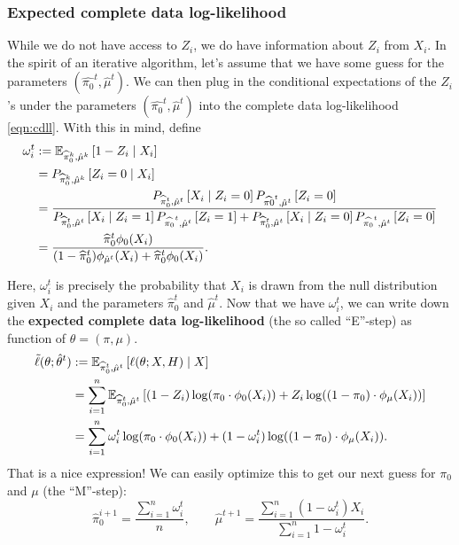 \subsubsection*{Expected complete data log-likelihood}
While we do not have access to $Z_i$, we do have information about $Z_i$ from $X_i$.  In the spirit of an iterative algorithm, let's assume that we have some guess for the parameters $(\hat{\pi_0}^t, \hat{\mu}^t)$. We can then plug in the conditional expectations of the $Z_i$'s under the parameters $(\hat{\pi_0}^t, \hat{\mu}^t)$ into the complete data log-likelihood \eqref{eqn:cdll}. With this in mind, define
\begin{align*}
\omega_i^t &:= {\mathbb E}_{\widehat{\pi}_0^k, \hat{\mu}^k} \left[ 1-Z_i \mid X_i \right] \\
&= P_{\widehat{\pi}_0^k, \hat{\mu}^k} \left[ Z_i = 0 \mid X_i \right] \\ 
&= \frac{P_{\widehat{\pi}_0^t, \hat{\mu}^t} \left[  X_i \mid Z_i = 0\right]P_{\widehat{\pi0}^t, \hat{\mu}^t}\left[Z_i = 0\right]}{P_{\widehat{\pi}_0^t, \hat{\mu}^t} \left[  X_i \mid Z_i = 1\right]P_{\widehat{\pi_0}^t, \hat{\mu}^t}\left[Z_i = 1\right]+P_{\widehat{\pi}_0^t, \hat{\mu}^t} \left[  X_i \mid Z_i = 0\right]P_{\widehat{\pi_0}^t, \hat{\mu}^t}\left[Z_i = 0\right] }\\
&= \frac{ \widehat{\pi}_0^t \phi_{0}(X_i)}{(1-\widehat{\pi}_0^t) \phi_{\hat{\mu}^t}(X_i) + \widehat{\pi}_0^t \phi_{0}(X_i)}.
\end{align*}

Here, $\omega_i^t$ is precisely the probability that $X_i$ is drawn from the null distribution given $X_i$ and the parameters $\hat{\pi}_0^t$ and $\hat{\mu}^t$. Now that we have $\omega_i^t$,  we can write down the \textbf{expected complete data log-likelihood} (the so called ``E''-step) as function of $\theta = (\pi,\mu)$.
\begin{align}
\tilde{\ell}(\theta; \hat{\theta}^t) &:= {\mathbb E}_{\widehat{\pi}_0^t, \hat{\mu}^t} \left[ \ell(\theta; X, H) \mid X \right] \label{eqn:estep} \\ 
&=\sum_{i=1}^n {\mathbb E}_{\widehat{\pi}_0^t, \hat{\mu}^t} \left[ (1-Z_i) \log(\pi_0 \cdot \phi_{0}(X_i)) + Z_i \log((1 - \pi_0) \cdot \phi_{\mu}(X_i))\right]\\ 
&=\sum_{i=1}^n \omega_i^t \log(\pi_0 \cdot \phi_{0}(X_i)) + (1-\omega_i^t) \log((1 - \pi_0) \cdot \phi_{\mu}(X_i)). \nonumber
\end{align}
That is a nice expression! We can easily optimize this to get our next guess for $\pi_0$ and $\mu$ (the ``M''-step):
\begin{equation}\label{eqn:mstep}
\widehat{\pi}_0^{i+1} = \frac{\sum_{i=1}^n \omega_i^t}{n} , \qquad \hat{\mu}^{t+1} = \frac{\sum_{i=1}^n (1-\omega_i^t) X_i}{\sum_{i=1}^n 1-\omega_i^t}.
\end{equation}


